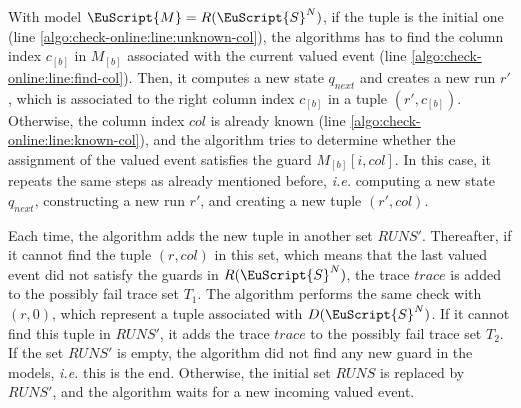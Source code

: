 With model $\EuScript{M} = R(\EuScript{S}^{N})$, if the tuple is
the initial one (line \ref{algo:check-online:line:unknown-col}),
the algorithms has to find the column index
$c_{[b]}$ in $M_{[b]}$ associated with the current valued event
(line \ref{algo:check-online:line:find-col}).  Then, it computes
a new state $q_{next}$ and creates a new run $r'$, which is
associated to the right column index $c_{[b]}$ in a tuple $(r',
c_{[b]})$.  Otherwise, the column index $col$ is already known
(line \ref{algo:check-online:line:known-col}), and the algorithm
tries to determine whether the assignment of the valued event
satisfies the guard $M_{[b]}[i, col]$. In this case, it repeats
the same steps as already mentioned before, \emph{i.e.} computing
a new state $q_{next}$, constructing a new run $r'$, and creating
a new tuple $(r', col)$.

Each time, the algorithm adds the new tuple in another set
$RUNS'$. Thereafter, if it cannot find the tuple $(r, col)$ in
this set, which means that the last valued event did not satisfy the
guards in $R(\EuScript{S}^{N})$, the trace $trace$ is added to
the possibly fail trace set $T_1$. The algorithm performs the
same check with $(r, 0)$, which represent a tuple associated with
$D(\EuScript{S}^{N})$. If it cannot find this tuple in $RUNS'$,
it adds the trace $trace$ to the possibly fail trace set $T_2$.
If the set $RUNS'$ is empty, the algorithm did not find any new
guard in the models, \emph{i.e.} this is the end. Otherwise, the
initial set $RUNS$ is replaced by $RUNS'$, and the algorithm
waits for a new incoming valued event.

